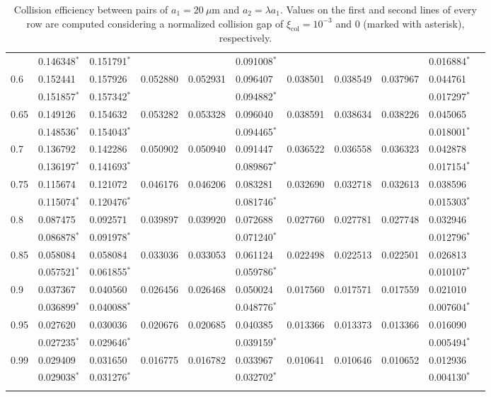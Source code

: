 \documentclass[../thesis.tex]{subfiles}
\begin{document}
\begin{landscape}
\begin{longtable}{lllllllllll}
 & 0.146348$^*$ & 0.151791$^*$ & & & 0.091008$^*$ & & & & 0.016884$^*$
 \\
 0.6 & 0.152441 & 0.157926 & 0.052880 & 0.052931 & 0.096407 & 0.038501 & 0.038549 & 0.037967 & 0.044761
 \\
 & 0.151857$^*$ & 0.157342$^*$ & & & 0.094882$^*$ & & & & 0.017297$^*$
 \\
 0.65 & 0.149126 & 0.154632 & 0.053282 & 0.053328 & 0.096040 & 0.038591 & 0.038634 & 0.038226 & 0.045065
 \\
 & 0.148536$^*$ & 0.154043$^*$ & & & 0.094465$^*$ & & & & 0.018001$^*$
 \\
 0.7 & 0.136792 & 0.142286 & 0.050902 & 0.050940 & 0.091447 & 0.036522 & 0.036558 & 0.036323 & 0.042878
 \\
 & 0.136197$^*$ & 0.141693$^*$ & & & 0.089867$^*$ & & & & 0.017154$^*$
 \\
 0.75 & 0.115674 & 0.121072 & 0.046176 & 0.046206 & 0.083281 & 0.032690 & 0.032718 & 0.032613 & 0.038596
 \\
 & 0.115074$^*$ & 0.120476$^*$ & & & 0.081746$^*$ & & & & 0.015303$^*$
 \\
 0.8 & 0.087475 & 0.092571 & 0.039897 & 0.039920 & 0.072688 & 0.027760 & 0.027781 & 0.027748 & 0.032946
 \\
 & 0.086878$^*$ & 0.091978$^*$ & & & 0.071240$^*$ & & & & 0.012796$^*$
 \\
 0.85 & 0.058084 & 0.058084 & 0.033036 & 0.033053 & 0.061124 & 0.022498 & 0.022513 & 0.022501 & 0.026813
 \\
 & 0.057521$^*$ & 0.061855$^*$ & & & 0.059786$^*$ & & & & 0.010107$^*$
 \\
 0.9 & 0.037367 & 0.040560 & 0.026456 & 0.026468 & 0.050024 & 0.017560 & 0.017571 & 0.017559 & 0.021010
 \\
 & 0.036899$^*$ & 0.040088$^*$ & & & 0.048776$^*$ & & & & 0.007604$^*$
 \\
 0.95 & 0.027620 & 0.030036 & 0.020676 & 0.020685 & 0.040385 & 0.013366 & 0.013373 & 0.013366 & 0.016090
 \\
 & 0.027235$^*$ & 0.029646$^*$ & & & 0.039159$^*$ & & & & 0.005494$^*$
 \\
 0.99 & 0.029409 & 0.031650 & 0.016775 & 0.016782 & 0.033967 & 0.010641 & 0.010646 & 0.010652 & 0.012936
 \\
 & 0.029038$^*$ & 0.031276$^*$ & & & 0.032702$^*$ & & & & 0.004130$^*$
 \\ \hline
 \caption{Collision efficiency between pairs of $a_1=20~\mu$m and $a_2=\lambda a_1$. Values on the first and second lines of every row are computed considering a normalized collision gap of $\xi_\text{col}=10^{-3}$ and $0$ (marked with asterisk), respectively.}
 \label{tab:E20}
\end{longtable}%


\end{landscape}
\end{document}
